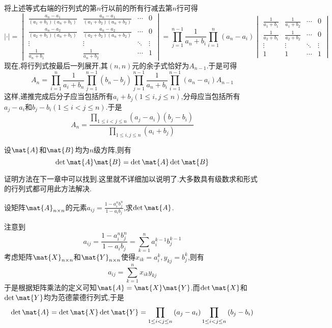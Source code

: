 \documentclass{ctexart}
\begin{document}
\begin{solution}
    将上述等式右端的行列式的第$n$行以前的所有行减去第$n$行可得
    \[|\cdot|=\begin{vmatrix}
        \frac{a_n-a_1}{\left(a_1+b_1\right)\left(a_n+b_1\right)}&\frac{a_n-a_1}{\left(a_1+b_2\right)\left(a_n+b_2\right)}&\cdots&0\\
        \frac{a_n-a_2}{\left(a_2+b_1\right)\left(a_n+b_1\right)}&\frac{a_n-a_2}{\left(a_2+b_2\right)\left(a_n+b_2\right)}&\cdots&0\\
        \vdots&\vdots&\ddots&\vdots\\
        \frac{1}{a_n+b_1}&\frac{1}{a_n+b_2}&\cdots&1
    \end{vmatrix}=\prod_{j=1}^{n-1}\dfrac{1}{a_n+b_i}\prod_{i=1}^{n}\left(a_n-a_i\right)\begin{vmatrix}
        \frac{1}{a_1+b_1}&\frac{1}{a_1+b_2}&\cdots&0\\
        \frac{1}{a_2+b_1}&\frac{1}{a_2+b_2}&\cdots&0\\
        \vdots&\vdots&\ddots&\vdots\\
        1&1&\cdots&1
    \end{vmatrix}\]
    现在,将行列式按最后一列展开,其$(n,n)$元的余子式恰好为$A_{n-1}$.于是可得
    \[A_n=\prod_{i=1}^{n}\dfrac{1}{a_i+b_n}\prod_{j=1}^{n-1}\left(b_n-b_j\right)\prod_{j=1}^{n-1}\dfrac{1}{a_n+b_i}\prod_{i=1}^{n-1}\left(a_n-a_i\right)A_{n-1}\]
    这样,递推完成后分子应当包括所有$a_i+b_j(1\leq i,j\leq n)$,分母应当包括所有$a_j-a_i$和$b_j-b_i(1\leq i<j\leq n)$.于是
    \[A_n=\dfrac{\displaystyle\prod_{1\leqslant i<j\leqslant n}\left(a_j-a_i\right)\left(b_j-b_i\right)}{\displaystyle\prod_{1\leqslant i,j\leqslant n}\left(a_i+b_j\right)}\]
\end{solution}
{\color{darkgreen}
\begin{theorem}
    设$\mat{A}$和$\mat{B}$均为$n$级方阵,则有
    \[\det\mat{A}\mat{B}=\det\mat{A}\det\mat{B}\]
\end{theorem}
证明方法在下一章中可以找到.这里就不详细加以说明了.大多数具有级数求和形式的行列式都可用此方法解决.}
\begin{problem}
    设矩阵$\mat{A}_{n\times n}$的元素$a_{ij}=\frac{1-a_i^nb_j^n}{1-a_ib_j}$,求$\det\mat{A}$.
\end{problem}
\begin{solution}
    注意到
    \[a_{ij}=\frac{1-a_i^nb_j^n}{1-a_ib_j}=\sum_{k=1}^{n}a_i^{k-1}b_j^{k-1}\]
    考虑矩阵$\mat{X}_{n\times n}$和$\mat{Y}_{n\times n}$使得$x_{ik}=a_i^k,y_{kj}=b_j^k$,则有
    \[a_{ij}=\sum_{k=1}^{n}x_{ik}y_{kj}\]
    于是根据矩阵乘法的定义可知$\mat{A}=\mat{X}\mat{Y}$.而$\det\mat{X}$和$\det\mat{Y}$均为范德蒙德行列式,于是
    \[\det\mat{A}=\det\mat{X}\det\mat{Y}=\prod_{1\leq i<j\leq n}\left(a_j-a_i\right)\prod_{1\leq i<j\leq n}\left(b_j-b_i\right)\]
\end{solution}
\end{document}
